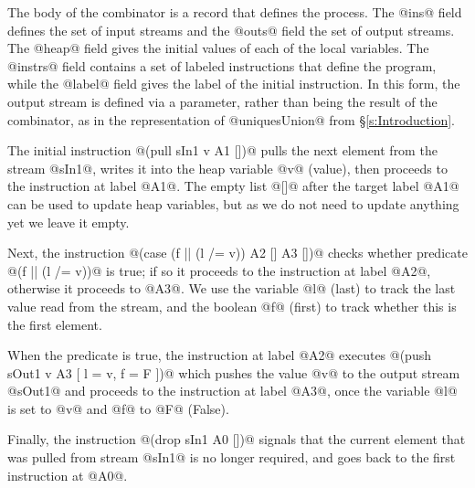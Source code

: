 The body of the combinator is a record that defines the process. The @ins@ field defines the set of input streams and the @outs@ field the set of output streams. The @heap@ field gives the initial values of each of the local variables. The @instrs@ field contains a set of labeled instructions that define the program, while the @label@ field gives the label of the initial instruction. In this form, the output stream is defined via a parameter, rather than being the result of the combinator, as in the representation of @uniquesUnion@ from \S\ref{s:Introduction}. 

The initial instruction @(pull sIn1 v A1 [])@ pulls the next element from the stream @sIn1@, writes it into the heap variable @v@ (value), then proceeds to the instruction at label @A1@. The empty list @[]@ after the target label @A1@ can be used to update heap variables, but as we do not need to update anything yet we leave it empty. 

Next, the instruction @(case (f || (l /= v)) A2 [] A3 [])@ checks whether predicate @(f || (l /= v))@ is true; if so it proceeds to the instruction at label @A2@, otherwise it proceeds to @A3@. We use the variable @l@ (last) to track the last value read from the stream, and the boolean @f@ (first) to track whether this is the first element.

When the predicate is true, the instruction at label @A2@ executes
@(push sOut1 v A3 [ l = v, f = F ])@
which pushes the value @v@ to the output stream @sOut1@ and proceeds to the instruction at label @A3@, once the variable @l@ is set to @v@ and @f@ to @F@ (False).

Finally, the instruction @(drop sIn1 A0 [])@ signals that the current element that was pulled from stream @sIn1@ is no longer required, and goes back to the first instruction at @A0@. 


